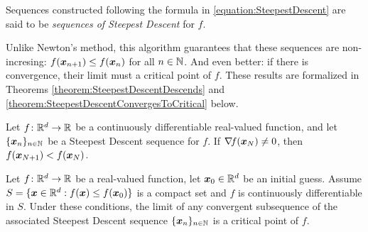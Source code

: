 \begin{remark}
Sequences constructed following the formula in \eqref{equation:SteepestDescent} are said to be \emph{sequences of Steepest Descent} for $f$.

Unlike Newton's method, this algorithm guarantees that these sequences are non-incresing: $f(\boldsymbol{x}_{n+1}) \leq f(\boldsymbol{x}_n)$ for all $n \in \mathbb{N}$.  And even better: if there is convergence, their limit must a critical point of $f$.  These results are formalized in Theorems \ref{theorem:SteepestDescentDescends} and \ref{theorem:SteepestDescentConvergesToCritical}  below.
\end{remark}

\begin{theorem}\label{theorem:SteepestDescentDescends}
Let $f\colon \mathbb{R}^d \to \mathbb{R}$ be a continuously differentiable real-valued function, and let $\{ \boldsymbol{x}_n \}_{n\in\mathbb{N}}$ be a Steepest Descent sequence for $f$.  If $\mathop{\nabla\! {f}}(\boldsymbol{x}_N) \neq 0$, then $f(\boldsymbol{x}_{N+1}) < f(\boldsymbol{x}_N)$.
\end{theorem}

\begin{theorem}\label{theorem:SteepestDescentConvergesToCritical}
Let $f\colon \mathbb{R}^d \to \mathbb{R}$ be a real-valued function, let $\boldsymbol{x}_0 \in \mathbb{R}^d$ be an initial guess.  Assume $S = \{ \boldsymbol{x} \in \mathbb{R}^d :  f(\boldsymbol{x}) \leq f(\boldsymbol{x}_0) \}$ is a compact set and $f$ is continuously differentiable in $S$.  Under these conditions, the limit of any convergent subsequence of the associated Steepest Descent sequence $\{ \boldsymbol{x}_n \}_{n\in \mathbb{N}}$ is a critical point of $f$.
\end{theorem}

